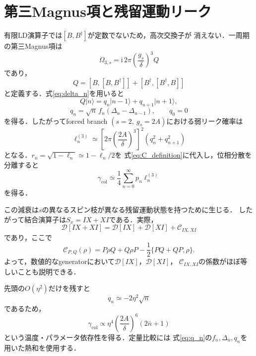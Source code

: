 \documentclass[dvipdfmx,a4paper,10pt]{jsarticle}
\newcommand{\ii}{\mathrm{i}}
\newcommand{\Dc}{\mathcal{D}}
\newcommand{\Cc}{\mathcal{C}}
\newcommand{\ket}[1]{\lvert #1\rangle}
\begin{document}
\section{第三Magnus項と残留運動リーク}

有限LD演算子では$[B,B^\dagger]$が定数でないため，高次交換子が
消えない．一周期の第三Magnus項は
\begin{equation}
 \Omega_{3,s}
 =\ii\,2\pi
 \left(\frac{g_s}{\delta}\right)^3Q
 \label{eq:omega3}
\end{equation}
であり，
\begin{equation}
 Q
 =[B,[B,B^\dagger]]
 +[B^\dagger,[B^\dagger,B]]
 \label{eq:Q_operator}
\end{equation}
と定義する．式\eqref{eq:delta_n}を用いると
\begin{equation}
 Q\ket{n}
 =q_n\ket{n-1}+q_{n+1}\ket{n+1},
\end{equation}
\begin{equation}
 \boxed{
 q_n
 =\sqrt{n}\,f_n(\Delta_n-\Delta_{n-1}),
 \qquad q_0=0
 }
 \label{eq:q_n}
\end{equation}
を得る．したがってforced branch
$(s=2,\ g_s=2A)$における弱リーク確率は
\begin{equation}
 \boxed{
 \ell_n^{(3)}
 \simeq
 \left[
 2\pi
 \left(\frac{2A}{\delta}\right)^3
 \right]^2
 \left(q_n^2+q_{n+1}^2\right)
 }
 \label{eq:leakage_n}
\end{equation}
となる．$r_n=\sqrt{1-\ell_n}\simeq1-\ell_n/2$を
式\eqref{eq:C_definition}に代入し，位相分散を分離すると
\begin{equation}
 \boxed{
 \gamma_{\mathrm{col}}
 \simeq
 \frac{1}{4}\sum_{n=0}^{\infty}p_n\ell_n^{(3)}
 }
 \label{eq:gammacol_leakage}
\end{equation}
を得る．

この減衰は$s$の異なるスピン枝が異なる残留運動状態を持つために生じる．
したがって結合演算子は$S_x=IX+XI$である．実際，
\begin{equation}
 \Dc[IX+XI]
 =\Dc[IX]+\Dc[XI]+\Cc_{IX,XI}
 \label{eq:collective_decomposition}
\end{equation}
であり，ここで
\begin{equation}
 \Cc_{P,Q}(\rho)
 =
 P\rho Q+Q\rho P
 -\frac{1}{2}\{PQ+QP,\rho\}.
\end{equation}
よって，数値的なgeneratorにおいて$\Dc[IX]$，$\Dc[XI]$，
$\Cc_{IX,XI}$の係数がほぼ等しいことも説明できる．

先頭の$O(\eta^2)$だけを残すと
\begin{equation}
 q_n\simeq-2\eta^2\sqrt{n}
\end{equation}
であるため，
\begin{equation}
 \gamma_{\mathrm{col}}
 \propto
 \eta^4
 \left(\frac{2A}{\delta}\right)^6
 (2\bar n+1)
 \label{eq:gammacol_scaling}
\end{equation}
という温度・パラメータ依存性を得る．定量比較には
式\eqref{eq:q_n}の$f_n,\Delta_n,q_n$を用いた熱和を使用する．
\end{document}
